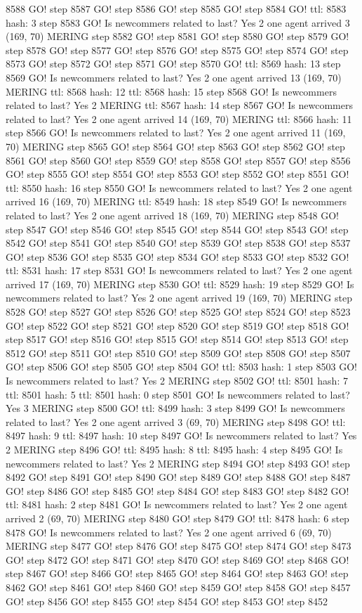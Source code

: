 8588 GO! step 8587 GO! step 8586 GO! step 8585 GO! step 8584 GO! ttl: 8583 hash: 3 step 8583 GO! Is newcommers related to last? Yes 2 one agent arrived 3 (169, 70) MERING step 8582 GO! step 8581 GO! step 8580 GO! step 8579 GO! step 8578 GO! step 8577 GO! step 8576 GO! step 8575 GO! step 8574 GO! step 8573 GO! step 8572 GO! step 8571 GO! step 8570 GO! ttl: 8569 hash: 13 step 8569 GO! Is newcommers related to last? Yes 2 one agent arrived 13 (169, 70) MERING ttl: 8568 hash: 12 ttl: 8568 hash: 15 step 8568 GO! Is newcommers related to last? Yes 2 MERING ttl: 8567 hash: 14 step 8567 GO! Is newcommers related to last? Yes 2 one agent arrived 14 (169, 70) MERING ttl: 8566 hash: 11 step 8566 GO! Is newcommers related to last? Yes 2 one agent arrived 11 (169, 70) MERING step 8565 GO! step 8564 GO! step 8563 GO! step 8562 GO! step 8561 GO! step 8560 GO! step 8559 GO! step 8558 GO! step 8557 GO! step 8556 GO! step 8555 GO! step 8554 GO! step 8553 GO! step 8552 GO! step 8551 GO! ttl: 8550 hash: 16 step 8550 GO! Is newcommers related to last? Yes 2 one agent arrived 16 (169, 70) MERING ttl: 8549 hash: 18 step 8549 GO! Is newcommers related to last? Yes 2 one agent arrived 18 (169, 70) MERING step 8548 GO! step 8547 GO! step 8546 GO! step 8545 GO! step 8544 GO! step 8543 GO! step 8542 GO! step 8541 GO! step 8540 GO! step 8539 GO! step 8538 GO! step 8537 GO! step 8536 GO! step 8535 GO! step 8534 GO! step 8533 GO! step 8532 GO! ttl: 8531 hash: 17 step 8531 GO! Is newcommers related to last? Yes 2 one agent arrived 17 (169, 70) MERING step 8530 GO! ttl: 8529 hash: 19 step 8529 GO! Is newcommers related to last? Yes 2 one agent arrived 19 (169, 70) MERING step 8528 GO! step 8527 GO! step 8526 GO! step 8525 GO! step 8524 GO! step 8523 GO! step 8522 GO! step 8521 GO! step 8520 GO! step 8519 GO! step 8518 GO! step 8517 GO! step 8516 GO! step 8515 GO! step 8514 GO! step 8513 GO! step 8512 GO! step 8511 GO! step 8510 GO! step 8509 GO! step 8508 GO! step 8507 GO! step 8506 GO! step 8505 GO! step 8504 GO! ttl: 8503 hash: 1 step 8503 GO! Is newcommers related to last? Yes 2 MERING step 8502 GO! ttl: 8501 hash: 7 ttl: 8501 hash: 5 ttl: 8501 hash: 0 step 8501 GO! Is newcommers related to last? Yes 3 MERING step 8500 GO! ttl: 8499 hash: 3 step 8499 GO! Is newcommers related to last? Yes 2 one agent arrived 3 (69, 70) MERING step 8498 GO! ttl: 8497 hash: 9 ttl: 8497 hash: 10 step 8497 GO! Is newcommers related to last? Yes 2 MERING step 8496 GO! ttl: 8495 hash: 8 ttl: 8495 hash: 4 step 8495 GO! Is newcommers related to last? Yes 2 MERING step 8494 GO! step 8493 GO! step 8492 GO! step 8491 GO! step 8490 GO! step 8489 GO! step 8488 GO! step 8487 GO! step 8486 GO! step 8485 GO! step 8484 GO! step 8483 GO! step 8482 GO! ttl: 8481 hash: 2 step 8481 GO! Is newcommers related to last? Yes 2 one agent arrived 2 (69, 70) MERING step 8480 GO! step 8479 GO! ttl: 8478 hash: 6 step 8478 GO! Is newcommers related to last? Yes 2 one agent arrived 6 (69, 70) MERING step 8477 GO! step 8476 GO! step 8475 GO! step 8474 GO! step 8473 GO! step 8472 GO! step 8471 GO! step 8470 GO! step 8469 GO! step 8468 GO! step 8467 GO! step 8466 GO! step 8465 GO! step 8464 GO! step 8463 GO! step 8462 GO! step 8461 GO! step 8460 GO! step 8459 GO! step 8458 GO! step 8457 GO! step 8456 GO! step 8455 GO! step 8454 GO! step 8453 GO! step 8452 